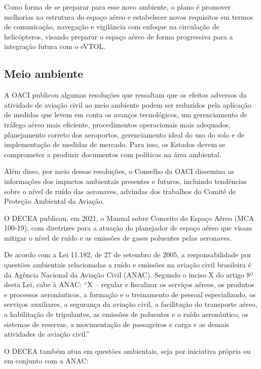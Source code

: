 \documentclass[
]{book}
\begin{document}
Como forma de se preparar para esse novo ambiente, o plano é promover melhorias na estrutura do espaço aéreo e estabelecer novos requisitos em termos de comunicação, navegação e vigilância com enfoque na circulação de helicópteros, visando preparar o espaço aéreo de forma progressiva para a integração futura com o eVTOL.

\hypertarget{meio-ambiente}{%
\subsection{Meio ambiente}\label{meio-ambiente}}

A OACI publicou algumas resoluções que ressaltam que os efeitos adversos da atividade de aviação civil ao meio ambiente podem ser reduzidos pela aplicação de medidas que levem em conta os avanços tecnológicos, um gerenciamento de tráfego aéreo mais eficiente, procedimentos operacionais mais adequados, planejamento correto dos aeroportos, gerenciamento ideal do uso do solo e de implementação de medidas de mercado. Para isso, os Estados devem se comprometer a produzir documentos com políticas na área ambiental.

Além disso, por meio dessas resoluções, o Conselho da OACI dissemina as informações dos impactos ambientais presentes e futuros, incluindo tendências sobre o nível de ruído das aeronaves, advindas dos trabalhos do Comitê de Proteção Ambiental da Aviação.

O DECEA publicou, em 2021, o Manual sobre Conceito do Espaço Aéreo (MCA 100-19), com diretrizes para a atuação do planejador de espaço aéreo que visam mitigar o nível de ruído e as emissões de gases poluentes pelas aeronaves.

De acordo com a Lei 11.182, de 27 de setembro de 2005, a responsabilidade por questões ambientais relacionadas a ruído e emissões na aviação civil brasileira é da Agência Nacional da Aviação Civil (ANAC). Segundo o inciso X do artigo 8º desta Lei, cabe à ANAC: ``X -- regular e fiscalizar os serviços aéreos, os produtos e processos aeronáuticos, a formação e o treinamento de pessoal especializado, os serviços auxiliares, a segurança da aviação civil, a facilitação do transporte aéreo, a habilitação de tripulantes, as emissões de poluentes e o ruído aeronáutico, os sistemas de reservas, a movimentação de passageiros e carga e as demais atividades de aviação civil.''

O DECEA também atua em questões ambientais, seja por iniciativa própria ou em conjunto com a ANAC:
\end{document}
